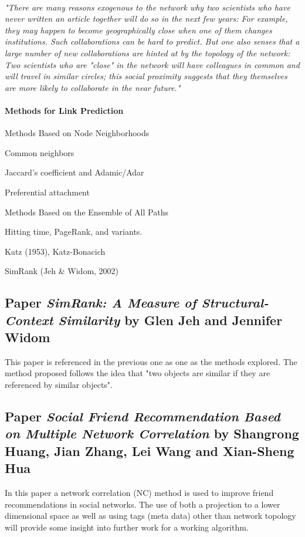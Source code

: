 \documentclass[12pt,a4paper]{report}
\begin{document}
\paragraph{} \emph{"There are many reasons exogenous to the network why two scientists who have never written an article together will do so in the next few years: For example, they may happen to become geographically close when one of them changes institutions. Such collaborations can be hard to predict. But one also senses that a large number of new collaborations are hinted at by the topology of the network: Two scientists who are "close" in the network will have colleagues in common and will travel in similar circles; this social proximity suggests that they themselves are more likely to collaborate in the near future."}


\paragraph{Methods for Link Prediction}
\begin{list}{•}{}
\item Methods Based on Node Neighborhoods
\item Common neighbors
\item Jaccard's coefficient and Adamic/Adar
\item Preferential attachment
\item Methods Based on the Ensemble of All Paths
\item Hitting time, PageRank, and variants.
\item Katz (1953), Katz-Bonacich
\item SimRank (Jeh \& Widom, 2002)
\end{list}

\subsection{Paper \emph{SimRank: A Measure of Structural-Context Similarity} by Glen Jeh and Jennifer Widom} This paper is referenced in the previous one as one as the methods explored. The method proposed follows the idea that "two objects are similar if they are referenced by similar objects".

\subsection{Paper \emph{Social Friend Recommendation Based on Multiple Network Correlation} by Shangrong Huang, Jian Zhang, Lei Wang and Xian-Sheng Hua} In this paper a network correlation (NC) method is used to improve friend recommendations in social networks. The use of both a projection to a lower dimensional space as well as using tags (meta data) other than network topology will provide some insight into further work for a working algorithm.
\end{document}
